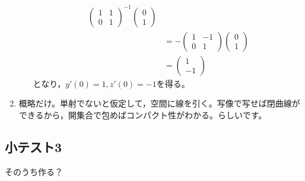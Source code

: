\documentclass[dvipdfmx,a4j,10pt]{jsarticle}
\theoremstyle{mystyle1}
\theoremstyle{mystyle2}
\begin{document}
\begin{enumerate}
\begin{enumerate}
\[\begin{split}
\begin{pmatrix}
            1 & 1\\
            0 & 1
        \end{pmatrix}^{-1}
        \begin{pmatrix}
            0 \\ 1
        \end{pmatrix}
        \\
        &=
        -\begin{pmatrix}
            1 & -1\\
            0 & 1
        \end{pmatrix}
        \begin{pmatrix}
            0 \\ 1
        \end{pmatrix}
        \\
        &=
        \begin{pmatrix}
            1 \\ -1
        \end{pmatrix}
        \end{split}
        \]
        となり，$y'(0)=1,z'(0)=-1$を得る。
    \end{enumerate}
    \item 概略だけ。単射でないと仮定して，空間に線を引く。写像で写せば閉曲線ができるから，開集合で包めばコンパクト性がわかる。らしいです。
\end{enumerate}

\subsection{小テスト3}

そのうち作る？
\end{document}
